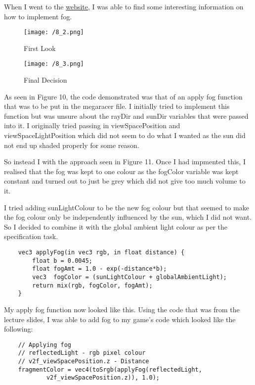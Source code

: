 \documentclass[11pt, oneside, a4paper]{article}
\begin{document}
When I went to the \href{https://iquilezles.org/www/articles/fog/fog.htm}{website}, I was able to find some interesting information on how to implement fog. 

\begin{figure}[H]
    \centering
    \begin{minipage}{1\textwidth}
        \centering
        \texttt{[image: /8\_2.png]}
        \caption{First Look}
    \end{minipage}
    \begin{minipage}{1\textwidth}
        \centering
        \texttt{[image: /8\_3.png]}
        \caption{Final Decision}
    \end{minipage}
\end{figure} 

As seen in Figure 10, the code demonstrated was that of an apply fog function that was to be put in the megaracer file. I initially tried to implement this function but was unsure about the rayDir and sunDir variables that were passed into it. I originally tried passing in viewSpacePosition and viewSpaceLightPosition which did not seem to do what I wanted as the sun did not end up shaded properly for some reason.

So instead I with the approach seen in Figure 11. Once I had impmented this, I realised that the fog was kept to one colour as the fogColor variable was kept constant and turned out to just be grey which did not give too much volume to it. 

I tried adding sunLightColour to be the new fog colour but that seemed to make the fog colour only be independently influenced by the sun, which I did not want. So I decided to combine it with the global ambient light colour as per the specification task.

\begin{lstlisting}
    vec3 applyFog(in vec3 rgb, in float distance) {
        float b = 0.0045; 
        float fogAmt = 1.0 - exp(-distance*b);
        vec3  fogColor = (sunLightColour + globalAmbientLight);
        return mix(rgb, fogColor, fogAmt);
    }
\end{lstlisting}

My apply fog function now looked like this. Using the code that was from the lecture slides, I was able to add fog to my game's code which looked like the following:

\begin{lstlisting}
    // Applying fog
    // reflectedLight - rgb pixel colour
    // v2f_viewSpacePosition.z - Distance
    fragmentColor = vec4(toSrgb(applyFog(reflectedLight,
            v2f_viewSpacePosition.z)), 1.0);
\end{lstlisting}
\end{document}
